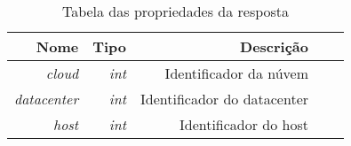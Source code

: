 \begin{table}[!htb]
    \centering
    \caption[response-optimization-shape]{Tabela das propriedades da resposta
    \label{tab:tabela-optimization}}
    \begin{tabular}{rrrrr}
        \toprule
            Nome & Tipo & Descrição \\ 
        \midrule
            \textit{cloud} & \textit{int} & Identificador da núvem \\
            \textit{datacenter} & \textit{int} & Identificador do datacenter \\
            \textit{host} & \textit{int} & Identificador do host \\
        \bottomrule
    \end{tabular}
\end{table}
